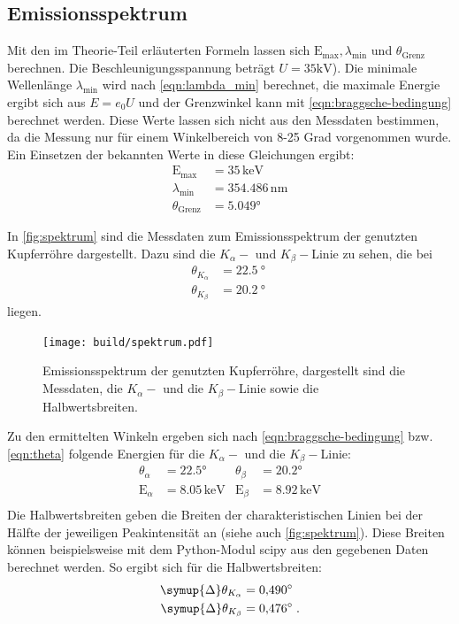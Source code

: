 \subsection{Emissionsspektrum}
Mit den im Theorie-Teil erläuterten Formeln lassen sich $\text{E}_\text{max}, \lambda_\text{min}$ und $\theta_\text{Grenz}$ berechnen. Die Beschleunigungsspannung beträgt $U=35 \si{\kilo\volt}$). Die minimale Wellenlänge $\lambda_\text{min}$ wird nach \autoref{eqn:lambda_min} berechnet, die maximale Energie ergibt sich aus $E = e_0 U$ und der Grenzwinkel kann mit \autoref{eqn:braggsche-bedingung} berechnet werden. Diese Werte lassen sich nicht aus den Messdaten bestimmen, da die Messung nur für einem Winkelbereich von 8-25 Grad vorgenommen wurde. Ein Einsetzen der bekannten Werte in diese Gleichungen ergibt:
\begin{align}
  \text{E}_\text{max} &= 35 \, \mathrm{keV}\\
  \lambda_\text{min} &= 354.486 \, \mathrm{nm}\\
  \theta_\text{Grenz} &= 5.049°
\end{align}

In \autoref{fig:spektrum} sind die Messdaten zum Emissionsspektrum der genutzten Kupferröhre dargestellt. Dazu sind die $K_\alpha-$ und $K_\beta-$Linie zu sehen, die bei
\begin{align*}
    \theta_{K_\alpha} &= \SI{22.5}{\degree} \\
    \theta_{K_\beta}  &= \SI{20.2}{\degree} \; 
\end{align*}
liegen.
\begin{figure}[H]
  \centering
  \texttt{[image: build/spektrum.pdf]}
  \caption{Emissionsspektrum der genutzten Kupferröhre, dargestellt sind die Messdaten, die $K_\alpha-$ und die $K_\beta-$Linie sowie die Halbwertsbreiten.}
  \label{fig:spektrum}
\end{figure}
\noindent
Zu den ermittelten Winkeln ergeben sich nach \autoref{eqn:braggsche-bedingung} bzw. \autoref{eqn:theta} folgende Energien für die $K_\alpha-$ und die $K_\beta-$Linie:
\begin{align}
  \theta_\alpha&=22.5° & \theta_\beta&=20.2° \\
  \text{E}_\alpha&=8.05 \, \mathrm{keV}   &\text{E}_\beta&=8.92 \, \mathrm{keV} \\
\end{align}
  Die Halbwertsbreiten geben die Breiten der charakteristischen Linien bei der Hälfte der jeweiligen Peakintensität an (siehe auch \autoref{fig:spektrum}). Diese Breiten können beispielsweise mit dem Python-Modul scipy aus den gegebenen Daten berechnet werden. So ergibt sich für die Halbwertsbreiten:
\begin{align}
  \symup{\Delta}\theta_{K_\alpha} &= \SI{0.490}{\degree} \\
  \symup{\Delta}\theta_{K_\beta}  &= \SI{0.476}{\degree} \; .
\end{align}


